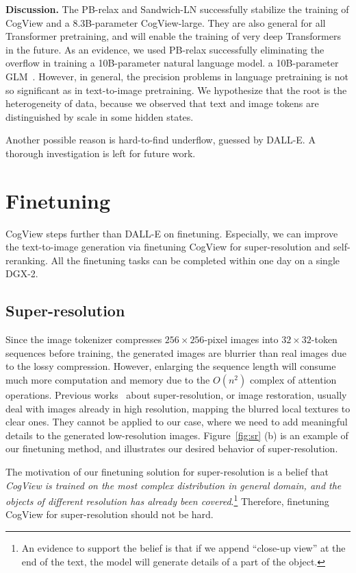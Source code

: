 \textbf{Discussion. }The PB-relax and Sandwich-LN successfully stabilize the training of CogView and a 8.3B-parameter CogView-large. They are also general for all Transformer pretraining, and will enable the training of very deep Transformers in the future. As an evidence, we used PB-relax successfully eliminating the overflow in training \ifblind a 10B-parameter natural language model.
\else
a 10B-parameter GLM~\cite{du2021all}.
\fi
However, in general, the precision problems in language pretraining is not so significant as in text-to-image pretraining. We hypothesize that the root is the heterogeneity of data, because we observed that text and image tokens are distinguished by scale in some hidden states. 

Another possible reason is hard-to-find underflow, guessed by DALL-E. A thorough investigation is left for future work. 

\section{Finetuning}
CogView steps further than DALL-E on finetuning. Especially, we can improve the text-to-image generation via finetuning CogView for super-resolution and self-reranking. All the finetuning tasks can be completed within one day on a single DGX-2.  

\subsection{Super-resolution}\label{sec:sr}
Since the image tokenizer compresses $256\times256$-pixel images into $32\times32$-token sequences before training, the generated images are blurrier than real images due to the lossy compression. However, enlarging the sequence length will consume much more computation and memory due to the $O(n^2)$ complex of attention operations. Previous works~\cite{dong2014learning} about super-resolution, or image restoration, usually deal with images already in high resolution, mapping the blurred local textures to clear ones. They cannot  be applied to our case, where we need to add meaningful details to the generated low-resolution images. Figure~\ref{fig:sr} (b) is an example of our finetuning method, and illustrates our desired behavior of super-resolution.

The motivation of our finetuning solution for super-resolution is a belief that \emph{CogView is trained on the most complex distribution in general domain, and the objects of different resolution has already been covered}.\footnote{An evidence to support the belief is that if we append ``close-up view'' at the end of the text, the model will generate details of a part of the object.} Therefore, finetuning CogView for super-resolution should not be hard.

